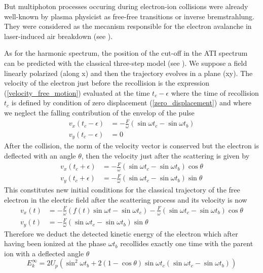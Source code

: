 \documentclass[a4paper]{article}
\begin{document}
\par
But multiphoton processes occuring during electron-ion collisions were already well-known by plasma physicist as free-free transitions or inverse bremstrahlung. They were considered as the mecanism responsible for the electron avalanche in laser-induced air breakdown (see \cite{Chin_2004}).
\par
As for the harmonic spectrum, the position of the cut-off in the ATI spectrum can be predicted with the classical three-step model (see \cite{Paulus_1994}). We suppose a field linearly polarized (along x) and then the trajectory evolves in a plane (xy). The velocity of the electron just before the recollision is the expression (\ref{velocity_free_motion}) evaluated at the time $t_{c}-\epsilon$ where the time of recollision $t_{c}$ is defined by condition of zero displacement (\ref{zero_displacement}) and where we neglect the falling contribution of the envelop of the pulse
\begin{align}
v_{x}(t_{c}-\epsilon)&=-\frac{F}{\omega} \left( \sin{\omega t_{c}} - \sin{\omega t_{b}} \right) \\
v_{y}(t_{c}-\epsilon)&=0
\end{align}
After the collision, the norm of the velocity vector is conserved but the electron is deflected with an angle $\theta$, then the velocity just after the scattering is given by
\begin{align}
v_{x}(t_{c}+\epsilon)&=-\frac{F}{\omega} \left( \sin{\omega t_{c}} - \sin{\omega t_{b}} \right) \cos{\theta} \\
v_{y}(t_{c}+\epsilon)&=-\frac{F}{\omega} \left( \sin{\omega t_{c}} - \sin{\omega t_{b}} \right) \sin{\theta}
\end{align}
This constitutes new initial conditions for the classical trajectory of the free electron in the electric field after the scattering process and its velocity is now
\begin{align}
v_{x}(t)&=-\frac{F}{\omega} \left(f(t)\sin{\omega t}-\sin{\omega t_{c}} \right) - \frac{F}{\omega} \left( \sin{\omega t_{c}}-\sin{\omega t_{b}} \right) \cos{\theta} \\
v_{y}(t)&=-\frac{F}{\omega} \left( \sin{\omega t_{c}} - \sin{\omega t_{b}} \right) \sin{\theta}
\end{align}
Therefore we deduct the detected kinetic energy of the electron which after having been ionized at the phase $\omega t_{b}$ recollides exactly one time with the parent ion with a deflected angle $\theta$
\begin{equation}
E_{k}^{\infty}=2 U_{p} \left(\sin^{2}{\omega t_{b}}+2(1-\cos{\theta})\sin{\omega t_{c}} \left(\sin{\omega t_{c}}-\sin{\omega t_{b}}\right)\right)
\label{kinetic_energy_theta}
\end{equation}
\end{document}
